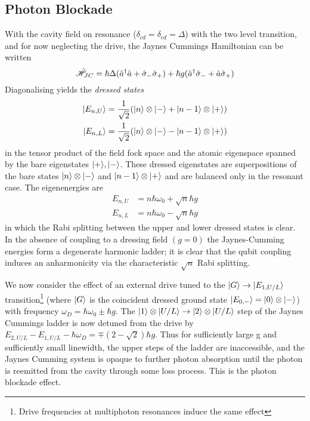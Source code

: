 \subsection{Photon Blockade}
With the cavity field on resonance ($\delta_{cd} = \delta_{cd} = \Delta$) with the two level transition, and for now neglecting the drive, the Jaynes Cummings Hamiltonian can be written \cite{Carmichael2015}
\begin{equation}
  \hat{\mathscr{H}}_{JC} = \hbar \Delta (\hat{a}^\dagger \hat{a} + \hat{\sigma}_- \hat{\sigma}_+) +\hbar g (\hat{a}^\dagger \hat{\sigma}_- + \hat{a} \hat{\sigma}_+)
\end{equation}
Diagonalising yields the \emph{dressed states}
\begin{align}
  | E_{n, U} \rangle & = \frac{1}{\sqrt{2}} (| n \rangle \otimes| - \rangle+| n-1 \rangle \otimes| + \rangle) \\
  | E_{n, L} \rangle & = \frac{1}{\sqrt{2}} (| n \rangle \otimes| - \rangle-| n-1 \rangle \otimes| + \rangle)
\end{align}
in the tensor product of the field fock space and the atomic eigenspace spanned by the bare eigenstates $| + \rangle, | - \rangle$. These dressed eigenstates are superpositions of the bare states $| n \rangle \otimes| - \rangle$ and $| n-1 \rangle \otimes| + \rangle$ and are balanced only in the resonant case. The eigenenergies are
\begin{align}
  E_{n, U} &= n \hbar \omega_0 + \sqrt{n} \hbar g \\
  E_{n, L} &= n \hbar \omega_0 - \sqrt{n} \hbar g
\end{align}
in which the Rabi splitting between the upper and lower dressed states is clear. In the absence of coupling to a dressing field $(g=0)$ the Jaynes-Cumming energies form a degenerate harmonic ladder; it is clear that the qubit coupling induces an anharmonicity via the characteristic $\sqrt{n}$ Rabi splitting.

We now consider the effect of an external drive tuned to the $| G \rangle \rightarrow | E_{1, U/L} \rangle$ transition\footnote{Drive frequencies at multiphoton resonances induce the same effect} (where $| G \rangle$ is the coincident dressed ground state $| E_{0, -} \rangle = | 0 \rangle \otimes| - \rangle$) with frequency $\omega_D = \hbar \omega_0 \pm \hbar g$.
The $| 1 \rangle \otimes| U/L \rangle \rightarrow | 2 \rangle \otimes| U/L \rangle$ step of the Jaynes Cummings ladder is now detuned from the drive by $E_{2, U/L} - E_{1, U/L} - \hbar \omega_D =  \mp(2-\sqrt{2}) \hbar g$. Thus for sufficiently large g and sufficiently small linewidth, the upper steps of the ladder are inaccessible, and the Jaynes Cumming system is opaque to further photon absorption until the photon is reemitted from the cavity through some loss process. This is the photon blockade effect.
